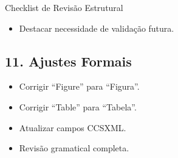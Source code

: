 \documentclass[11pt,a4paper]{article}
\begin{document}
\begin{boxAvisos}{Checklist de Revisão Estrutural}
\begin{itemize}
    \textbf{Modelo de Reescrita:}
    
    \textit{``Os resultados obtidos até o momento indicam viabilidade técnica do sistema, sendo necessária validação experimental com amostra ampliada para avaliação do impacto atencional.''}

    \item[$\boxtimes$] Destacar necessidade de validação futura.
\end{itemize}


\subsection*{11. Ajustes Formais}

\begin{itemize}
    \item[$\boxtimes$] Corrigir ``Figure'' para ``Figura''.
    \item[$\boxtimes$] Corrigir ``Table'' para ``Tabela''.
    \item[$\Box$] Atualizar campos CCSXML.
    \item[$\Box$] Revisão gramatical completa.
\end{itemize}


\end{boxAvisos}
\end{document}
